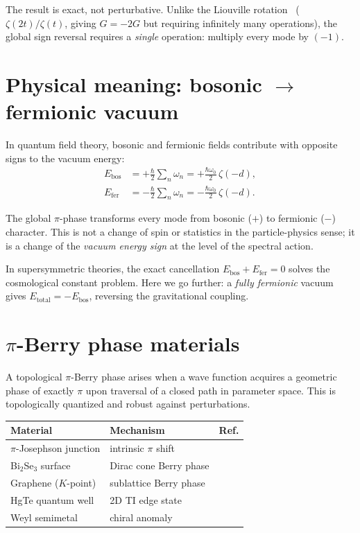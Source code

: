 \documentclass[aps,prl,twocolumn,superscriptaddress,nofootinbib]{revtex4-2}
\begin{document}
The result is exact, not perturbative.
Unlike the Liouville rotation~\cite{WB_gravity_control}
($\zeta(2t)/\zeta(t)$, giving $G = -2G$
but requiring infinitely many operations),
the global sign reversal requires a \emph{single} operation:
multiply every mode by $(-1)$.

\section{Physical meaning: bosonic $\to$ fermionic vacuum}

In quantum field theory, bosonic and fermionic fields
contribute with opposite signs to the vacuum energy:
\begin{align}
  E_{\mathrm{bos}} &= +\tfrac{\hbar}{2}\sum_n \omega_n
  = +\tfrac{\hbar\omega_0}{2}\,\zeta(-d), \\
  E_{\mathrm{fer}} &= -\tfrac{\hbar}{2}\sum_n \omega_n
  = -\tfrac{\hbar\omega_0}{2}\,\zeta(-d).
\end{align}

The global $\pi$-phase transforms every mode from bosonic ($+$)
to fermionic ($-$) character.
This is not a change of spin or statistics in the particle-physics sense;
it is a change of the \emph{vacuum energy sign}
at the level of the spectral action.

In supersymmetric theories, the exact cancellation
$E_{\mathrm{bos}} + E_{\mathrm{fer}} = 0$ solves the
cosmological constant problem.
Here we go further: a \emph{fully fermionic} vacuum gives
$E_{\mathrm{total}} = -E_{\mathrm{bos}}$,
reversing the gravitational coupling.

\section{$\pi$-Berry phase materials}

A topological $\pi$-Berry phase arises when a wave function
acquires a geometric phase of exactly $\pi$ upon traversal
of a closed path in parameter space.
This is topologically quantized and robust against perturbations.

\begin{center}
\begin{tabular}{lll}
\toprule
Material & Mechanism & Ref. \\
\midrule
$\pi$-Josephson junction & intrinsic $\pi$ shift & \cite{Ryazanov2001} \\
Bi$_2$Se$_3$ surface & Dirac cone Berry phase & \cite{Zhang2009} \\
Graphene ($K$-point) & sublattice Berry phase & \cite{Novoselov2005} \\
HgTe quantum well & 2D TI edge state & \cite{Koenig2007} \\
Weyl semimetal & chiral anomaly & \cite{Xu2015} \\
\bottomrule
\end{tabular}
\end{center}
\end{document}
